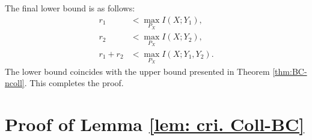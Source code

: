 \documentclass[runningheads]{llncs}
\newcommand{\parbreak}{ \vspace{0.3 em}}
\begin{document}
\parbreak The final lower bound is as follows:
\begin{align*}
    r_1 &<  \max_{P_{X}} I(X;Y_1),\\
    r_2 &<  \max_{P_{X}} I(X;Y_2),\\
    r_1+r_2&<\max_{P_{X}} I(X;Y_1,Y_2) .
\end{align*}
The lower bound coincides with the upper bound presented in Theorem \ref{thm:BC-ncoll}. This completes the proof. 







\section{Proof of Lemma \ref{lem: cri. Coll-BC}}\label{app: proof of lem: cri. Coll-BC}
\end{document}
